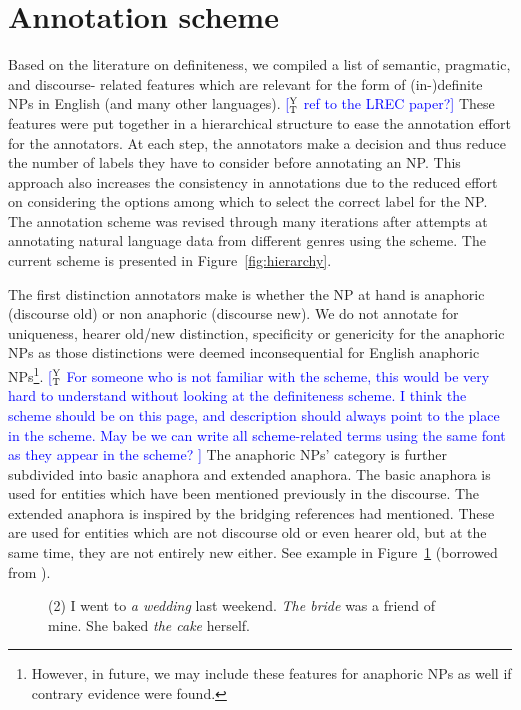 \documentclass[11pt,letterpaper]{article}
\newcommand{\ensuretext}[1]{#1}
\newcommand{\ytmarker}{\ensuretext{\textcolor{blue}{\ensuremath{^{\textsc{Y}}_{\textsc{T}}}}}}
\newcommand{\arkcomment}[3]{\ensuretext{\textcolor{#3}{[#1 #2]}}}
\newcommand{\yt}[1]{\arkcomment{\ytmarker}{#1}{blue}}
\begin{document}
\section{Annotation scheme}\label{sec:scheme}
Based on the literature on definiteness, we compiled a list of semantic, pragmatic, and discourse- related features which are relevant for the form of (in-)definite NPs in English (and many other languages). \yt{ref to the LREC paper?} These features were put together in a hierarchical structure to ease the annotation effort for the annotators. At each step, the annotators make a decision and thus reduce the number of labels they have to consider before annotating an NP. This approach also increases the consistency in annotations due to the reduced effort on considering the options among which to select the correct label for the NP. The annotation scheme was revised through many iterations after attempts at annotating natural language data from different genres using the scheme. The current scheme is presented in Figure~\ref{fig:hierarchy}. 

The first distinction annotators make is whether the NP at hand is anaphoric (discourse old) or non anaphoric (discourse new). We do not annotate for uniqueness, hearer old/new distinction, specificity or genericity for the anaphoric NPs as those distinctions were deemed inconsequential for English anaphoric NPs\footnote{However, in future, we may include these features for anaphoric NPs as well if contrary evidence were found.}. \yt{For someone who is not familiar with the scheme, this would be very hard to understand without looking at the definiteness scheme. I think the scheme should be on this page, and description should always point to the place in the scheme. May be we can write all scheme-related terms using the same font as they appear in the scheme? } The anaphoric NPs’ category is further subdivided into basic anaphora and extended anaphora. The basic anaphora is used for entities which have been mentioned previously in the discourse. The extended anaphora is inspired by the bridging references \citet{clark77} had mentioned. These are used for entities which are not discourse old or even hearer old, but at the same time, they are not entirely new either.  See example in Figure~\ref{fig:bridging} (borrowed from \citet{poesio98}). 

\begin{figure}
\vspace*{0.1cm}
\begin{footnotesize}
(2) I went to {\it a wedding} last weekend. {\it The bride} was a friend of mine. She baked {\it the cake} herself. 
\end{footnotesize}
\label{fig:bridging}
\end{figure}
\end{document}
